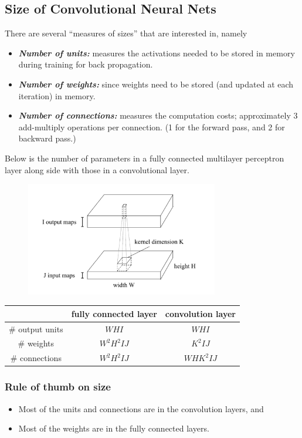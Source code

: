 \documentclass[11pt]{article}
\begin{document}
\subsection{Size of Convolutional Neural Nets}
There are several ``measures of sizes'' that are interested in, namely
\begin{itemize}
    \item \textit{\textbf{Number of units:}} measures the activations needed to be stored in memory during training for back propagation.
    \item \textit{\textbf{Number of weights:}} since weights need to be stored (and updated at each iteration) in memory. 
    \item \textit{\textbf{Number of connections:}} measures the computation costs; approximately 3 add-multiply operations per connection. (1 for the forward pass, and 2 for backward pass.)
\end{itemize}
Below is the number of parameters in a fully connected multilayer perceptron layer along side with those in a convolutional layer. \cite{convNetSize}
\begin{figure}[H]
    \center\includegraphics[width=0.75\textwidth]{img/size_conv_net}
\end{figure}
\begin{center}
    \begin{tabular}{c||c|c|}
        & fully connected layer & convolution layer \\
        \hline \hline
        \# output units & $WHI$ & $WHI$ \\
        \hline 
        \# weights & $W^2H^2IJ$ & $K^2IJ$ \\
        \hline
        \# connections & $W^2H^2IJ$ & $WHK^2IJ$ \\
        \hline
    \end{tabular}
\end{center}

\subsubsection{Rule of thumb on size}
\begin{itemize}
    \item Most of the units and connections are in the convolution layers, and
    \item Most of the weights are in the fully connected layers. 
\end{itemize}
\end{document}
